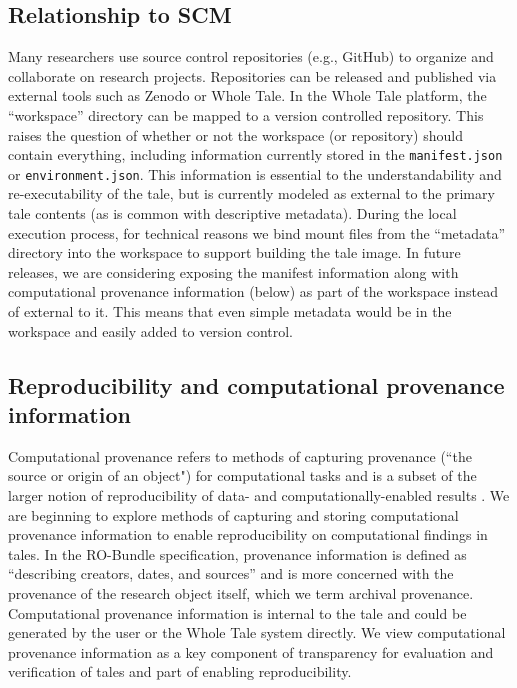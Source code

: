 \documentclass[conference]{IEEEtran}
\begin{document}
\subsection{Relationship to SCM}
Many researchers use source control repositories (e.g., GitHub) to organize and collaborate on research projects. Repositories can be released and published via external tools such as Zenodo or Whole Tale. In the Whole Tale platform, the ``workspace'' directory can be mapped to a version controlled repository. This raises the question of whether or not the workspace (or repository) should contain everything, including information currently stored in the \texttt{manifest.json} or \texttt{environment.json}. This information is essential to the understandability and re-executability of the tale, but is currently modeled as external to the primary tale contents (as is common with descriptive metadata). During the local execution process, for technical reasons we bind mount files from the ``metadata'' directory into the workspace to support building the tale 
image. In future releases, we are considering exposing the manifest information along with computational provenance information (below) as part of the workspace instead of external to it. This means that even simple metadata would be in the workspace and easily added to version control.

\subsection{Reproducibility and computational provenance information}
Computational provenance refers to methods of capturing provenance (``the source or origin of an object") for computational tasks \cite{freire2008} and is a subset of the larger notion of reproducibility of data- and computationally-enabled results \cite{stodden2013a, stodden2014a, stodden2014b, stodden2015, stodden2016}. We are beginning to explore methods of capturing and storing computational provenance information to enable reproducibility on computational findings in tales. In the RO-Bundle specification, provenance information is defined as ``describing creators, dates, and sources'' and is more concerned with the provenance of the research object itself, which we term archival provenance. Computational provenance information is internal to the tale and could be generated by the user or the Whole Tale system directly. We view computational provenance information as a key component of transparency for evaluation and verification of tales and part of enabling reproducibility.
\end{document}
